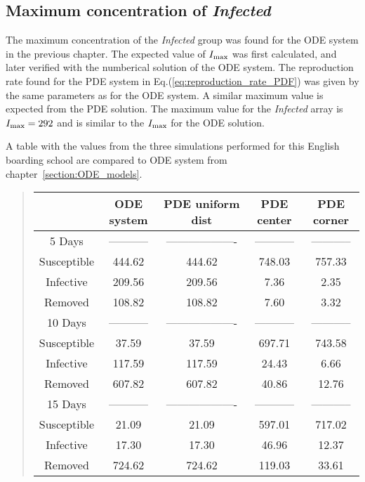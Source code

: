 \documentclass[%
twoside,                 %
final,                   %
chapterprefix=true,      %
open=right               %
10pt]{book}
\begin{document}
\subsection{Maximum concentration of \emph{Infected}}
The maximum concentration of the \emph{Infected} group was found for the ODE system in the previous chapter. The expected value of $I_{\textrm{max}}$ was first calculated, and later verified with the numberical solution of the ODE system. The reproduction rate found for the PDE system in Eq.(\ref{eq:reproduction_rate_PDF}) was given by the same parameters as for the ODE system. A similar maximum value is expected from the PDE solution. The maximum value for the \emph{Infected} array is $I_{\textrm{max}}=292$ and is similar to the $I_{\textrm{max}}$ for the ODE solution. 

A table with the values from the three simulations performed for this English boarding school are compared to ODE system from chapter~\ref{section:ODE_models}.

\label{table:british_number_table}

\begin{quote}
\begin{tabular}{ccccc}
\hline
\multicolumn{1}{c}{  } & \multicolumn{1}{c}{ ODE system } & \multicolumn{1}{c}{ PDE uniform dist } & \multicolumn{1}{c}{ PDE center } & \multicolumn{1}{c}{ PDE corner } \\
\hline
5 Days      & ----------- & ------------------- & ----------- & ----------- \\
\hline
Susceptible & 444.62      & 444.62              & 748.03      & 757.33      \\
Infective   & 209.56      & 209.56              & 7.36        & 2.35        \\
Removed     & 108.82      & 108.82              & 7.60        & 3.32        \\
\hline
10 Days     & ----------- & ------------------- & ----------- & ----------- \\
\hline
Susceptible & 37.59       & 37.59               & 697.71      & 743.58      \\
Infective   & 117.59      & 117.59              & 24.43       & 6.66        \\
Removed     & 607.82      & 607.82              & 40.86       & 12.76       \\
\hline
15 Days     & ----------- & ------------------- & ----------- & ----------- \\
\hline
Susceptible & 21.09       & 21.09               & 597.01      & 717.02      \\
Infective   & 17.30       & 17.30               & 46.96       & 12.37       \\
Removed     & 724.62      & 724.62              & 119.03      & 33.61       \\
\hline
\end{tabular}
\end{quote}
\end{document}
